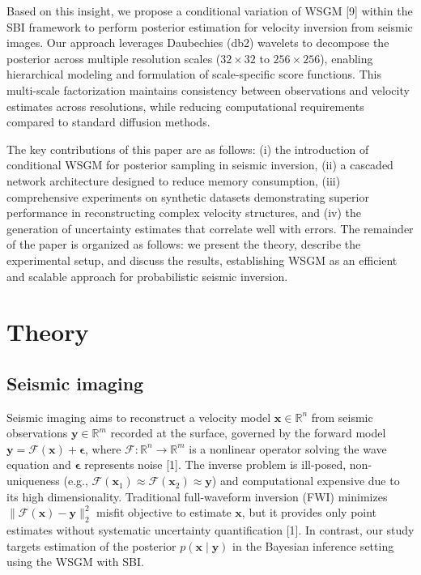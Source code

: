 \documentclass[
]{article}
\begin{document}
Based on this insight, we propose a conditional variation of WSGM
{[}9{]} within the SBI framework to perform posterior estimation for
velocity inversion from seismic images. Our approach leverages
Daubechies (db2) wavelets to decompose the posterior across multiple
resolution scales (\(32 \times 32\) to \(256 \times 256\)), enabling
hierarchical modeling and formulation of scale-specific score functions.
This multi-scale factorization maintains consistency between
observations and velocity estimates across resolutions, while reducing
computational requirements compared to standard diffusion methods.

The key contributions of this paper are as follows: (i) the introduction
of conditional WSGM for posterior sampling in seismic inversion, (ii) a
cascaded network architecture designed to reduce memory consumption,
(iii) comprehensive experiments on synthetic datasets demonstrating
superior performance in reconstructing complex velocity structures, and
(iv) the generation of uncertainty estimates that correlate well with
errors. The remainder of the paper is organized as follows: we present
the theory, describe the experimental setup, and discuss the results,
establishing WSGM as an efficient and scalable approach for
probabilistic seismic inversion.

\section{Theory}\label{theory}

\subsection{Seismic imaging}\label{seismic-imaging}

Seismic imaging aims to reconstruct a velocity model
\(\mathbf{x} \in \mathbb{R}^n\) from seismic observations
\(\mathbf{y} \in \mathbb{R}^m\) recorded at the surface, governed by the
forward model
\(\mathbf{y} = \mathbf{\mathcal{F}}(\mathbf{x}) + \boldsymbol{\epsilon}\),
where \(\mathbf{\mathcal{F}}: \mathbb{R}^n \rightarrow \mathbb{R}^m\) is
a nonlinear operator solving the wave equation and
\(\boldsymbol{\epsilon}\) represents noise {[}1{]}. The inverse problem
is ill-posed, non-uniqueness (e.g.,
\(\mathbf{\mathcal{F}}(\mathbf{x}_1) \approx \mathbf{\mathcal{F}}(\mathbf{x}_2) \approx \mathbf{y}\))
and computational expensive due to its high dimensionality. Traditional
full-waveform inversion (FWI) minimizes
\(\|\mathbf{\mathcal{F}}(\mathbf{x}) - \mathbf{y}\|_2^2\) misfit
objective to estimate \(\mathbf{x}\), but it provides only point
estimates without systematic uncertainty quantification {[}1{]}. In
contrast, our study targets estimation of the posterior
\(p(\mathbf{x} \mid \mathbf{y})\) in the Bayesian inference setting
using the WSGM with SBI.
\end{document}
